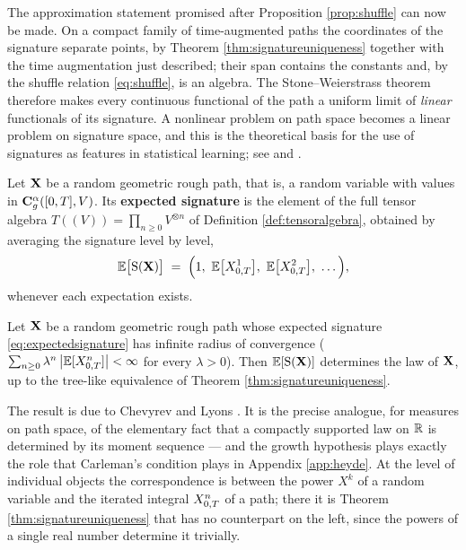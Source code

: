 The approximation statement promised after Proposition \ref{prop:shuffle} can now be made. On a
compact family of time-augmented paths the coordinates of the signature separate points, by Theorem
\ref{thm:signatureuniqueness} together with the time augmentation just described; their span
contains the constants and, by the shuffle relation \eqref{eq:shuffle}, is an algebra. The
Stone--Weierstrass theorem therefore makes every continuous functional of the path a uniform limit
of \emph{linear} functionals of its signature. A nonlinear problem on path space becomes a linear
problem on signature space, and this is the theoretical basis for the use of signatures as features
in statistical learning; see \cite{chevyrevkormilitzin2016} and \cite{levinlyonsni2013}. 


\begin{definition}\label{def:expectedsignature}
Let $\mathbf{X}$ be a random geometric rough path, that is, a random variable with values in
$\mathbf{C}_{g}^{\alpha}([0,T],V)$. Its \textbf{expected signature} is the element of the full tensor
algebra $T((V)) = \prod_{n\geq0}V^{\otimes n}$ of Definition \ref{def:tensoralgebra}, obtained by
averaging the signature level by level,
\begin{equation}\label{eq:expectedsignature}
\E\bigl[\Sig(\rpX)\bigr] \;=\; \Bigl(1,\ \E\bigl[X^1_{0,\Mat}\bigr],\ \E\bigl[X^2_{0,\Mat}\bigr],\ \dots\Bigr),
\end{equation}
whenever each expectation exists.
\end{definition}

\begin{theorem}\label{thm:expectedsignature}
Let $\mathbf{X}$ be a random geometric rough path whose expected signature \eqref{eq:expectedsignature}
has infinite radius of convergence (
$\sum_{n\geq0}\lambda^{n}\,\bigl|\mathbb{E}[X^n_{0,T}]\bigr| < \infty$ for every $\lambda>0$). Then
$\mathbb{E}[\mathrm{S}(\mathbf{X})]$ determines the law of $\mathbf{X}$, up to the tree-like equivalence of Theorem
\ref{thm:signatureuniqueness}. \qedopentext
\end{theorem}

The result is due to Chevyrev and Lyons \cite{chevyrevlyons2016}. It is the precise analogue, for
measures on path space, of the elementary fact that a compactly supported law on $\mathbb{R}$ is determined
by its moment sequence --- and the growth hypothesis plays exactly the role that Carleman's condition
plays in Appendix \ref{app:heyde}.  At the level of individual objects the correspondence is between the power $X^k$ of a random
variable and the iterated integral $X^n_{0,T}$ of a path; there it is Theorem
\ref{thm:signatureuniqueness} that has no counterpart on the left, since the powers of a single
real number determine it trivially. 

